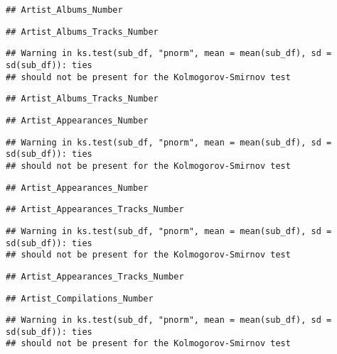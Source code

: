 \documentclass[
]{article}
\begin{document}
\begin{verbatim}
## Artist_Albums_Number
\end{verbatim}

\begin{verbatim}
## Artist_Albums_Tracks_Number
\end{verbatim}

\begin{verbatim}
## Warning in ks.test(sub_df, "pnorm", mean = mean(sub_df), sd = sd(sub_df)): ties
## should not be present for the Kolmogorov-Smirnov test
\end{verbatim}

\begin{verbatim}
## Artist_Albums_Tracks_Number
\end{verbatim}

\begin{verbatim}
## Artist_Appearances_Number
\end{verbatim}

\begin{verbatim}
## Warning in ks.test(sub_df, "pnorm", mean = mean(sub_df), sd = sd(sub_df)): ties
## should not be present for the Kolmogorov-Smirnov test
\end{verbatim}

\begin{verbatim}
## Artist_Appearances_Number
\end{verbatim}

\begin{verbatim}
## Artist_Appearances_Tracks_Number
\end{verbatim}

\begin{verbatim}
## Warning in ks.test(sub_df, "pnorm", mean = mean(sub_df), sd = sd(sub_df)): ties
## should not be present for the Kolmogorov-Smirnov test
\end{verbatim}

\begin{verbatim}
## Artist_Appearances_Tracks_Number
\end{verbatim}

\begin{verbatim}
## Artist_Compilations_Number
\end{verbatim}

\begin{verbatim}
## Warning in ks.test(sub_df, "pnorm", mean = mean(sub_df), sd = sd(sub_df)): ties
## should not be present for the Kolmogorov-Smirnov test
\end{verbatim}
\end{document}
